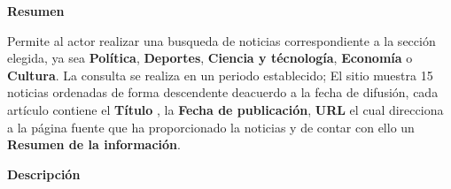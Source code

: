 

\begin{large}
	\textbf{Resumen}\\
\end{large}

Permite al actor realizar una busqueda de noticias correspondiente a la sección elegida, ya sea \textbf{Política}, \textbf{Deportes}, \textbf{Ciencia y técnología}, \textbf{Economía} o \textbf{Cultura}. La consulta se realiza en un periodo establecido; El sitio muestra 15 noticias ordenadas de forma descendente deacuerdo a la fecha de difusión, cada artículo contiene el \textbf{Título} , la \textbf{Fecha de publicación}, \textbf{URL} el cual direcciona a la página fuente que ha proporcionado la noticias y de contar con ello  un \textbf{Resumen de la información}.\\

\begin{large}
	\textbf{Descripción}\\
\end{large}




